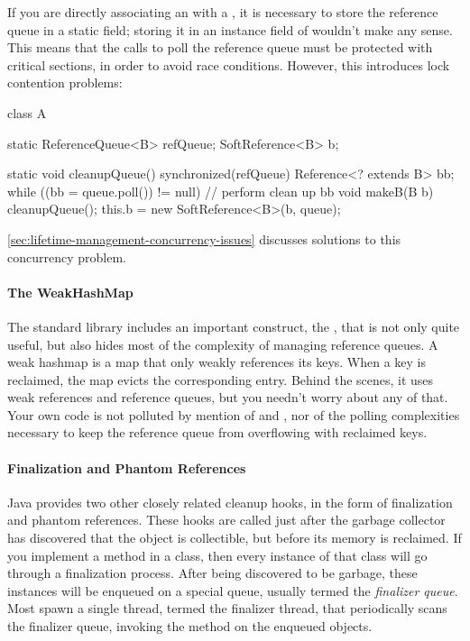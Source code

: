 If you are directly associating an  with a , it is 
necessary to store the reference queue in a static field; storing it in an
instance field of  wouldn't make any sense. This means that the calls
to poll the reference queue must be protected with critical sections, in order
to avoid race conditions. However, this introduces lock contention problems:
\begin{shortlisting}
class A {
   static ReferenceQueue<B> refQueue;
   SoftReference<B> b;
   
   static void cleanupQueue() {
      synchronized(refQueue) {
         Reference<? extends B> bb;
         while ((bb = queue.poll()) != null) {
            // perform clean up bb
         }
      }
   }
   void makeB(B b) {
      cleanupQueue();   
      this.b = new SoftReference<B>(b, queue);
   }
}
\end{shortlisting}
\autoref{sec:lifetime-management-concurrency-issues} discusses solutions to this
concurrency problem.

\paragraph{The WeakHashMap}
\label{sec:weakhashmap}

The standard library includes an important construct, the ,
that is not only quite useful, but also hides most of the complexity of managing
reference queues. A weak hashmap is a map that only weakly references its keys.
When a key is reclaimed, the map evicts the corresponding entry. Behind the
scenes, it uses weak references and reference queues, but you needn't worry about
any of that. Your own code is not polluted by mention of 
and , nor of the polling complexities necessary to keep the
reference queue from overflowing with reclaimed keys.

\paragraph{Finalization and Phantom References}

Java provides two other closely related cleanup hooks, in the form of
finalization and phantom references. These hooks are called just after the
garbage collector has discovered that the object is collectible, but before its
memory is reclaimed. If you implement a  method in a class, then
every instance of that class will go through a finalization process. After being
discovered to be garbage, these instances will be enqueued on a special queue,
usually termed the \emph{finalizer queue}. Most \jres spawn a single thread,
termed the finalizer thread, that periodically scans the finalizer queue,
invoking the  method on the enqueued objects.


